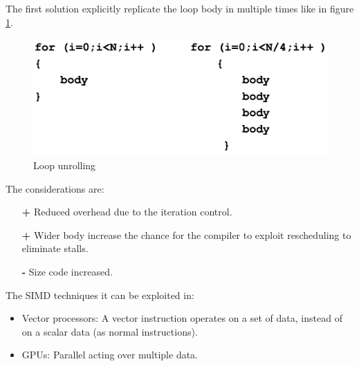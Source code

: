 \documentclass[12pt]{article}
\begin{document}
The first solution explicitly replicate the loop body in multiple times like in figure \ref{fig:unrolling}.
\begin{figure}[h!]
  \centering
  \includegraphics[width=\linewidth]{images/unrolling.png}
  \caption{Loop unrolling}
  \label{fig:unrolling}
\end{figure}
The considerations are:
\begin{itemize}
  \item[\textbf{+}] Reduced overhead due to the iteration control.
  \item[\textbf{+}] Wider body increase the chance for the compiler to exploit rescheduling to eliminate stalls.
  \item[\textbf{-}] Size code increased.
\end{itemize}

The SIMD techniques it can be exploited in:
\begin{itemize}
  \item Vector processors: A vector instruction operates on a set of data, instead of on a scalar data (as normal instructions).
  \item GPUs: Parallel acting over multiple data.
\end{itemize}
\end{document}
